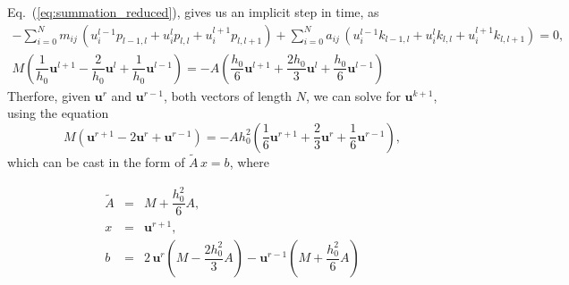 \documentclass[nofootinbib,preprintnumbers,superscriptaddress,notitlepage]{revtex4-1}
\newcommand{\<}{\begin{equation}}
\newcommand{\?}{\end{equation}}
\begin{document}
Eq.~(\ref{eq:summation_reduced}), gives us an implicit step in time, as
\begin{eqnarray}
- \sum\limits_{i=0}^{N} m_{ij}\, \left(u_i^{l-1} p_{l-1, l} + u_i^{l} p_{l, l} + u_i^{l+1} p_{l, l+1} \right)
+ \sum\limits_{i=0}^{N} a_{ij}\, \left(u_i^{l-1} k_{l-1, l} + u_i^{l} k_{l, l} + u_i^{l+1} k_{l, l+1} \right) = 0, \\
M  \left( \dfrac{1}{h_0}\mathbf{u}^{l+1} -  \dfrac{2}{h_0}\mathbf{u}^{l} + \dfrac{1}{h_0}\mathbf{u}^{l-1} \right)
= - A \left( \dfrac{h_0}{6}\mathbf{u}^{l+1} +  \dfrac{2 h_0}{3}\mathbf{u}^{l} + \dfrac{h_0}{6}\mathbf{u}^{l-1} \right) 
\end{eqnarray}
Therfore, given $\mathbf{u}^r$ and $\mathbf{u}^{r-1}$, both vectors of length $N$, we can solve for $\mathbf{u}^{k+1}$, using the equation
\begin{equation}
M  \left(\mathbf{u}^{r+1} -  2\mathbf{u}^{r} + \mathbf{u}^{r-1} \right)
= - A h_0^2 \left( \dfrac{1}{6}\mathbf{u}^{r+1} +  \dfrac{2}{3}\mathbf{u}^{r} + \dfrac{1}{6}\mathbf{u}^{r-1} \right),
\end{equation}
which can be cast in the form of $\tilde{A}\, x = b$, where

\begin{eqnarray}
\tilde{A} &=& M + \dfrac{h_0^2}{6}A, \\
x &=& \mathbf{u}^{r+1}, \\
b &=& 2\,\mathbf{u}^{r}\left(M - \dfrac{2 h_0^2}{3}A\right) - \mathbf{u}^{r-1} \left(M + \dfrac{h_0^2}{6}A\right)
\end{eqnarray}



\end{document}
